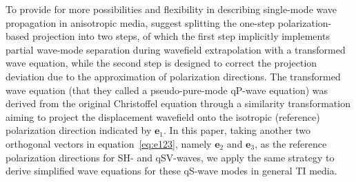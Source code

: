 To provide for more possibilities and flexibility in describing single-mode wave propagation in anisotropic media, \mbox{\cite{cheng.kang:2014}} suggest splitting
the one-step polarization-based projection into two steps, of which the first step implicitly implements partial wave-mode separation
during wavefield extrapolation with a transformed wave equation, while the second step is designed to correct the
projection deviation due to the approximation of polarization directions.
The transformed wave equation (that they called a pseudo-pure-mode qP-wave equation) was derived from the original Christoffel equation through
a similarity transformation aiming to project the displacement wavefield onto the isotropic (reference) polarization direction indicated by $\mathbf{e}_1$.  
In this paper, taking another two orthogonal vectors in equation~\ref{eq:e123}, namely $\mathbf{e}_2$ and $\mathbf{e}_3$,
as the reference polarization directions for SH- and qSV-waves,
we apply the same strategy to derive simplified wave equations for these qS-wave modes in general TI media.

%
